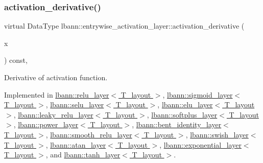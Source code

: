 \subsubsection{\texorpdfstring{activation\+\_\+derivative()}{activation\_derivative()}}
{\footnotesize\ttfamily virtual Data\+Type lbann\+::entrywise\+\_\+activation\+\_\+layer\+::activation\+\_\+derivative (\begin{DoxyParamCaption}\item[{Data\+Type}]{x }\end{DoxyParamCaption}) const\hspace{0.3cm}{\ttfamily [protected]}, {}}

Derivative of activation function. 

Implemented in \hyperlink{classlbann_1_1relu__layer_a70cbfb59155a255b1422995875868790}{lbann\+::relu\+\_\+layer$<$ T\+\_\+layout $>$}, \hyperlink{classlbann_1_1sigmoid__layer_a2736bf99e3304083cd964f6707c2f666}{lbann\+::sigmoid\+\_\+layer$<$ T\+\_\+layout $>$}, \hyperlink{classlbann_1_1selu__layer_ac5500795e66343c0c8968c24683b79f0}{lbann\+::selu\+\_\+layer$<$ T\+\_\+layout $>$}, \hyperlink{classlbann_1_1elu__layer_ae972ed930008d1bbe499996a6f55de7e}{lbann\+::elu\+\_\+layer$<$ T\+\_\+layout $>$}, \hyperlink{classlbann_1_1leaky__relu__layer_af37ff5bcaefa8e533b3c497611ff43d4}{lbann\+::leaky\+\_\+relu\+\_\+layer$<$ T\+\_\+layout $>$}, \hyperlink{classlbann_1_1softplus__layer_a164deff1fd79a8eea743580eba4f6a60}{lbann\+::softplus\+\_\+layer$<$ T\+\_\+layout $>$}, \hyperlink{classlbann_1_1power__layer_af879c6b5488e1c8efe9e8c92b1be474c}{lbann\+::power\+\_\+layer$<$ T\+\_\+layout $>$}, \hyperlink{classlbann_1_1bent__identity__layer_ae331e8e0f830641cba6b3561f5474eb3}{lbann\+::bent\+\_\+identity\+\_\+layer$<$ T\+\_\+layout $>$}, \hyperlink{classlbann_1_1smooth__relu__layer_a44b4b163830213b9fb270e9ef2cc70ae}{lbann\+::smooth\+\_\+relu\+\_\+layer$<$ T\+\_\+layout $>$}, \hyperlink{classlbann_1_1swish__layer_a42d0ffb540fe1c12fbb571abf7048c2a}{lbann\+::swish\+\_\+layer$<$ T\+\_\+layout $>$}, \hyperlink{classlbann_1_1atan__layer_a2df8ba467a7375eab14d1b821e1386f0}{lbann\+::atan\+\_\+layer$<$ T\+\_\+layout $>$}, \hyperlink{classlbann_1_1exponential__layer_a5d432d9bd73c02e2a22d313c9d2dfcd7}{lbann\+::exponential\+\_\+layer$<$ T\+\_\+layout $>$}, and \hyperlink{classlbann_1_1tanh__layer_abd215b554cdb1e6eed1c651772a227e9}{lbann\+::tanh\+\_\+layer$<$ T\+\_\+layout $>$}.

\mbox{\label{classlbann_1_1entrywise__activation__layer_af632a590e26f335205994f1d715ae1a4}} 
